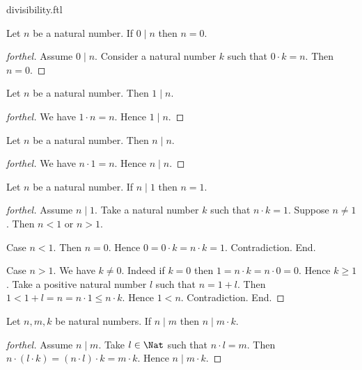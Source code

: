 \documentclass{naproche-library}
\begin{document}
\begin{smodule}{divisibility.ftl}
  \begin{proposition}[forthel,id=ARITHMETIC_07_8611150130315264]
    Let $n$ be a natural number.
    If $0 \mid n$ then $n = 0$.
  \end{proposition}
  \begin{proof}[forthel]
    Assume $0 \mid n$.
    Consider a natural number $k$ such that $0 \cdot k = n$.
    Then $n = 0$.
  \end{proof}

  \begin{proposition}[forthel,id=ARITHMETIC_07_1259086070939648]
    Let $n$ be a natural number.
    Then $1 \mid n$.
  \end{proposition}
  \begin{proof}[forthel]
    We have $1 \cdot n = n$.
    Hence $1 \mid n$.
  \end{proof}

  \begin{proposition}[forthel,id=ARITHMETIC_07_3944887330275328]
    Let $n$ be a natural number.
    Then $n \mid n$.
  \end{proposition}
  \begin{proof}[forthel]
    We have $n \cdot 1 = n$.
    Hence $n \mid n$.
  \end{proof}

  \begin{proposition}[forthel,id=ARITHMETIC_07_6917446193643520]
    Let $n$ be a natural number.
    If $n \mid 1$ then $n = 1$.
  \end{proposition}
  \begin{proof}[forthel]
    Assume $n \mid 1$.
    Take a natural number $k$ such that $n \cdot k = 1$.
    Suppose $n \neq 1$.
    Then $n < 1$ or $n > 1$.

    Case $n < 1$.
      Then $n = 0$.
      Hence $0
        = 0 \cdot k
        = n \cdot k
        = 1$.
      Contradiction.
    End.

    Case $n > 1$.
      We have $k \neq 0$.
      Indeed if $k = 0$ then
      $1
        = n \cdot k
        = n \cdot 0
        = 0$.
      Hence $k \geq 1$.
      Take a positive natural number $l$ such that $n = 1 + l$.
      Then $1
        < 1 + l
        = n
        = n \cdot 1
        \leq n \cdot k$.
      Hence $1 < n$.
      Contradiction.
    End.
  \end{proof}

  \begin{proposition}[forthel,id=ARITHMETIC_07_7463519983239168]
    Let $n, m, k$ be natural numbers.
    If $n \mid m$ then $n \mid m \cdot k$.
  \end{proposition}
  \begin{proof}[forthel]
    Assume $n \mid m$.
    Take $l \in \Nat$ such that $n \cdot l = m$.
    Then $n \cdot (l \cdot k)
      = (n \cdot l) \cdot k
      = m \cdot k$.
    Hence $n \mid m \cdot k$.
  \end{proof}


\end{smodule}
\end{document}
